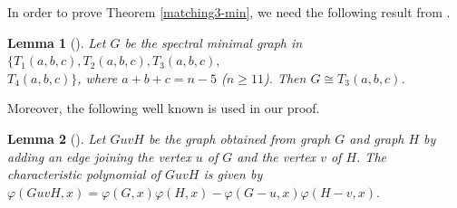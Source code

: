 \documentclass[12pt]{amsart}
\newtheorem{lem}{Lemma}[section]
\begin{document}
In order to prove Theorem \ref{matching3-min}, we need the following result from \cite{Xu2009}.
\begin{lem}[\cite{Xu2009}]\label{T-3}
	Let \( G \) be the spectral minimal graph in $\{ T_1(a,b,c), T_2(a,b,c), T_3(a,b,c), $\\$T_4(a,b,c) \}$, 
	where  \( a + b + c = n - 5\) ($n \geq 11$).
	Then \( G \cong T_3(a,b,c)\).
\end{lem}

Moreover, the following well known is used in our proof.


\begin{lem}[\cite{AW2011}]\label{characteristic}
	Let $GuvH$ be the graph obtained from graph $G$ and graph $H$ by adding an edge joining the vertex $u$ of $G$ and the vertex $v$ of $H$. The characteristic polynomial of $GuvH$ is given by
	\(
	\varphi(GuvH,x) = \varphi(G,x)\varphi(H,x) - \varphi(G-u,x)\varphi(H-v,x).
	\)
\end{lem}
\end{document}
